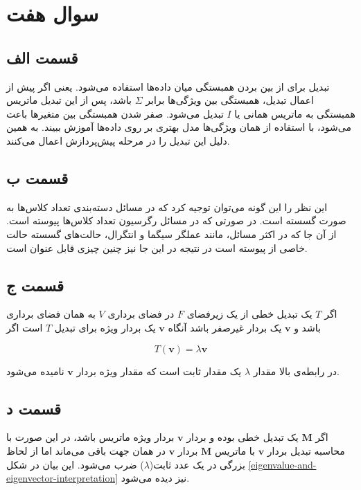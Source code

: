 \documentclass[14pt,a4]{article}
\begin{document}
\section*{سوال هفت}

\subsection*{قسمت الف}

تبدیل  برای از بین بردن همبستگی میان داده‌ها استفاده می‌شود. یعنی اگر پیش از اعمال تبدیل،
همبستگی بین ویژگی‌ها برابر $\Sigma$ باشد، پس از این تبدیل ماتریس همبستگی به ماتریس همانی یا $I$ تبدیل می‌شود.
صفر شدن همبستگی بین متغیر‌ها باعث می‌شود، با استفاده از همان ویژگی‌ها مدل بهتری بر روی داده‌ها آموزش ببیند.
به همین دلیل این تبدیل را در مرحله‌ پیش‌پردازش اعمال می‌کنند.

\subsection*{قسمت ب}

این نظر را این گونه می‌توان توجیه کرد که در مسائل دسته‌بندی تعداد کلاس‌ها به صورت گسسته است. در صورتی که
در مسائل رگرسیون تعداد کلاس‌ها پیوسته است. از آن جا که در اکثر مسائل، مانند عملگر سیگما و انتگرال،
حالت‌های گسسته حالت خاصی از پیوسته است در نتیجه در این جا نیز چنین چیزی قابل عنوان است.

\subsection*{قسمت ج}

اگر $T$ یک تبدیل  خطی از یک زیرفضای $F$ در فضای برداری $V$ به همان فضای برداری باشد و $\textbf{v}$ یک بردار غیرصفر باشد
آنگاه $\textbf{v}$ یک بردار ویژه برای تبدیل $T$ است اگر

$$T(\textbf{v}) = \lambda \textbf{v}$$

در رابطه‌ی بالا مقدار $\lambda$ یک مقدار ثابت است که مقدار ویژه بردار $\textbf{v}$ نامیده می‌شود.

\subsection*{قسمت د}

اگر $\textbf{M}$ یک تبدیل خطی بوده و بردار $\textbf{v}$ بردار ویژه ماتریس باشد، در این صورت با محاسبه‌
تبدیل بردار $\textbf{v}$ با ماتریس $\textbf{M}$ بردار $\textbf{v}$ در همان جهت باقی می‌ماند اما از لحاظ
بزرگی در یک عدد ثابت($\lambda$) ضرب می‌شود. این بیان در شکل \ref{eigenvalue-and-eigenvector-interpretation}
نیز دیده می‌شود.
\end{document}
